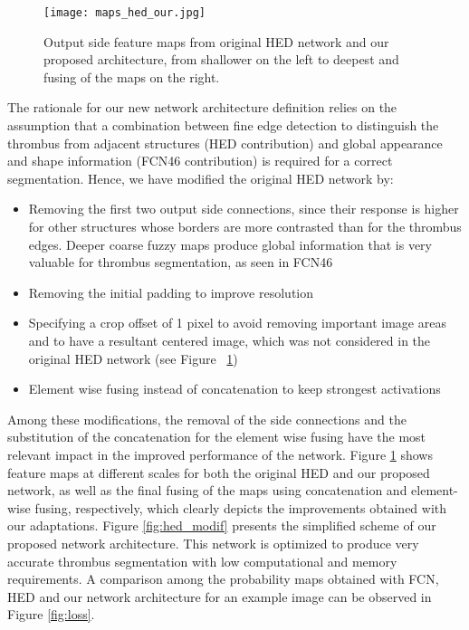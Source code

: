 \documentclass[preprint,authoryear,12pt]{elsarticle}
\begin{document}
\begin{figure}[htb]
\centering
\texttt{[image: maps\_hed\_our.jpg]}
\caption{\label{fig:hed_maps}Output side feature maps from original HED network and our proposed architecture, from shallower on the left to deepest and fusing of the maps on the right.}
\end{figure}

The rationale for our new network architecture definition relies on the assumption that a combination between fine edge detection to distinguish the thrombus from adjacent structures (HED contribution) and global appearance and shape information (FCN46 contribution) is required for a correct segmentation. Hence, we have modified the original HED network by:

\begin{itemize}
\item Removing the first two output side connections, since their response is higher for other structures whose borders are more contrasted than for the thrombus edges. Deeper coarse fuzzy maps produce global information that is very valuable for thrombus segmentation, as seen in FCN46
\item Removing the initial padding to improve resolution
\item Specifying a crop offset of 1 pixel to avoid removing important image areas and to have a resultant centered image, which was not considered in the original HED network (see Figure ~\ref{fig:hed_maps})
\item Element wise fusing instead of concatenation to keep strongest activations 
\end{itemize}


Among these modifications, the removal of the side connections and the substitution of the concatenation for the element wise fusing have the most relevant impact in the improved performance of the network. Figure \ref{fig:hed_maps} shows feature maps at different scales for both the original HED and our proposed network, as well as the final fusing of the maps using concatenation and element-wise fusing, respectively, which clearly depicts the improvements obtained with our adaptations. Figure \ref{fig:hed_modif} presents the simplified scheme of our proposed network architecture.
This network is optimized to produce very accurate thrombus segmentation with low computational and memory requirements. A comparison among the probability maps obtained with FCN, HED and our network architecture for an example image can be observed in Figure \ref{fig:loss}. \par  
\end{document}
